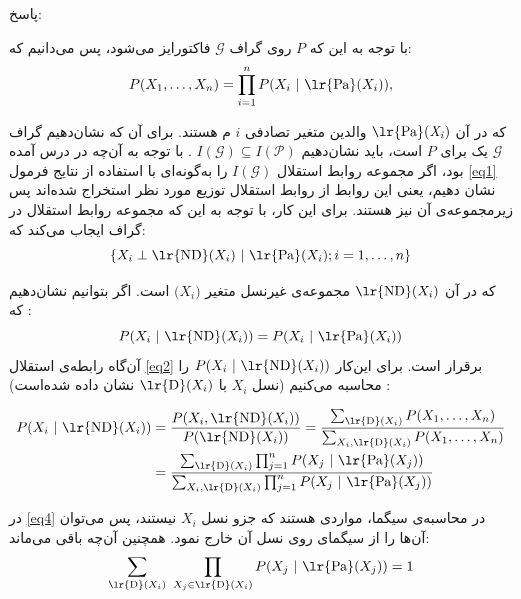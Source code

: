\documentclass[11.5pt,a4paper]{article}
\begin{document}
پاسخ: 

با توجه به این که $\mathit{P}$ روی گراف $\mathcal{G}$ فاکتورایز می‌شود، پس می‌دانیم که: 
\begin{equation}
P (X_1 , \dots , X_n ) = \prod_{i=1}^n P (X_i \ | \ \text{\lr{Pa}}(X_i )),
\label{eq1}
\end{equation}

که در آن 
$\mathit{\text{\lr{Pa}}(X_i)}$ 
والدین متغیر تصادفی 
$\mathit{i}$
م هستند. برای آن که نشان‌دهیم گراف $\mathcal{G}$ یک 
برای 
$\mathit{P}$
است، باید نشان‌دهیم 
$\mathit{I}(\mathcal{G}) \subseteq \mathit{I}(\mathcal{P})$
. با توجه به آن‌چه در درس آمده بود، اگر مجموعه روابط استقلال 
$\mathit{I}(\mathcal{G})$
را به‌گونه‌ای با استفاده از نتایج فرمول \ref{eq1} نشان‌ دهیم، یعنی این روابط از روابط استقلال توزیع مورد نظر استخراج شده‌اند پس زیرمجموعه‌ی آن نیز هستند. برای این کار، با توجه به این که مجموعه روابط استقلال در گراف ایجاب می‌کند که: 
\begin{equation}
\lbrace X_{i} \perp \text{\lr{ND}}(X_{i}) \ | \ \text{\lr{Pa}}(X_i); i = 1, \dots , n \rbrace
\label{eq2}
\end{equation}

که در آن
$\text{\lr{ND}}(X_{i})$
مجموعه‌ی غیرنسل متغیر 
$\mathit(X_{i})$
است. اگر بتوانیم نشان‌دهیم که :
\begin{equation}
P(X_{i} \ | \ \text{\lr{ND}}(X_{i})) =  P(X_{i} \ | \ \text{\lr{Pa}}(X_i))
\label{eq3}
\end{equation}
آن‌گاه رابطه‌ی استقلال \ref{eq2} برقرار است. برای این‌کار 
$P(X_{i} \ | \ \text{\lr{ND}}(X_{i}))$
را محاسبه می‌کنیم (نسل 
$X_i$
با 
$\text{\lr{D}}(X_i)$
نشان داده شده‌است) : 
\begin{spreadlines}{15pt}  
\begin{equation}
\begin{split}
{P(X_{i} \ | \ \text{\lr{ND}}(X_{i}))} & = {{P(X_{i} , \text{\lr{ND}}(X_{i}))} \over {P(\text{\lr{ND}}(X_{i}))} } = { {\sum_{\text{\lr{D}}(X_i)} P(X_1 , \dots , X_n)} \over {\sum_{X_i , \text{\lr{D}}(X_i)} P(X_1 , \dots , X_n)} } \\ 
	& = { {\sum_{\text{\lr{D}}(X_i)} \prod_{j=1}^{n}P(X_j\ | \ {\text{\lr{Pa}}(X_j)})} \over {\sum_{X_i, \text{\lr{D}}(X_i) } \prod_{j=1}^{n}P(X_j\ | \ {\text{\lr{Pa}}(X_j)})} }
\end{split}
\label{eq4}
\end{equation}
\end{spreadlines}
در \ref{eq4} در محاسبه‌ی سیگما، مواردی هستند که جزو نسل 
$X_i$
نیستند، پس می‌توان آن‌ها را از سیگمای روی نسل آن خارج نمود. همچنین آن‌چه باقی می‌ماند:
\begin{equation*}
{\sum_{\text{\lr{D}}(X_i)} \ \prod_{X_j \in {\text{\lr{D}}(X_i)}}P(X_j\ | \ {\text{\lr{Pa}}(X_j)})} = 1
\end{equation*}
\end{document}
